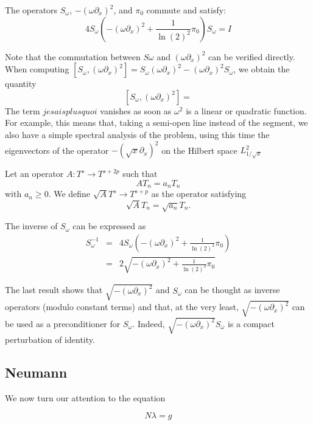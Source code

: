 \documentclass[]{article}
\begin{document}
\begin{The}
	The operators $S_\omega$, $-(\omega\partial_x)^2$, and $\pi_0$ commute and satisfy: 
	\[4 S_{\omega}\left(-(\omega\partial_x)^2 + \frac{1}{\ln(2)^2} \pi_0 \right)S_{\omega} = I\]
\end{The}
Note that the commutation between $S\omega$ and $(\omega \partial_x)^2$ can be verified directly. When computing $[S_\omega,(\omega\partial_x)^2] = S_\omega (\omega \partial_x)^2 - (\omega\partial_x)^2S_\omega$, we obtain the quantity
\[[S_\omega,(\omega\partial_x)^2] = \]
The term $ jesaisplusquoi$  vanishes as soon as $\omega^2$ is a linear or quadratic function. For example, this means that, taking a semi-open line instead of the segment, we also have a simple spectral analysis of the problem, using this time the eigenvectors of the operator $-(\sqrt{x} \partial_x)^2$ on the Hilbert space $L^2_{1/\sqrt{x}}$
\begin{Def}
	Let an operator $A : T^s \to T^{s + 2p}$ such that 
	\[AT_n = a_n T_n\]
	with $a_n \geq 0$. We define $\sqrt{A} T^s \to T^{s + p}$ as the operator satisfying 
	\[\sqrt{A}T_n = \sqrt{a_n} T_n.\]
\end{Def}

\begin{Cor}
	The inverse of $S_\omega$ can be expressed as 
	\begin{eqnarray*}
		S_{\omega}^{-1} &=& 4S_\omega\left(-(\omega \partial_x)^2 + \frac{1}{\ln(2)^2} \pi_0 \right)\\
		&=& 2\sqrt{-(\omega \partial_x)^2 + \frac{1}{\ln(2)^2}\pi_0}
	\end{eqnarray*}
\end{Cor}
The last result shows that $\sqrt{-(\omega \partial_x)^2}$ and $S_\omega$ can be thought as inverse operators (modulo constant terms) and that, at the very least, $\sqrt{-(\omega \partial_x)^2}$ can be used as a preconditioner for $S_\omega$. Indeed, $\sqrt{-(\omega \partial_x)^2}S_\omega$ is a compact perturbation of identity. 







\subsection{Neumann} 

We now turn our attention to the equation 

\begin{equation}
N\lambda = g
\label{EquationIntegrale2}
\end{equation} 
\end{document}

